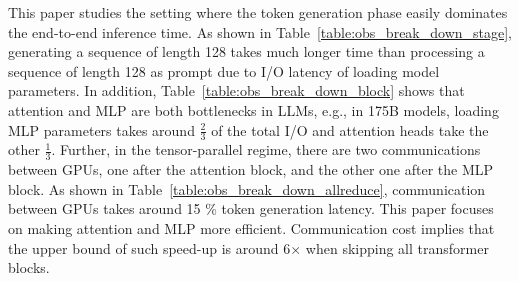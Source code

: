 This paper studies the setting where the token generation phase easily dominates the end-to-end inference time. As shown in Table~\ref{table:obs_break_down_stage}, generating a sequence of length 128 takes much longer time than processing a sequence of length 128 as prompt due to I/O latency of loading model parameters. In addition, Table~\ref{table:obs_break_down_block} shows that attention and MLP are both bottlenecks in LLMs, e.g., in 175B models, loading MLP parameters takes around $\frac{2}{3}$ of the total I/O and attention heads take the other $\frac{1}{3}$. Further, in the tensor-parallel regime, there are two communications between GPUs, one after the attention block, and the other one after the MLP block. As shown in Table~\ref{table:obs_break_down_allreduce}, communication between GPUs takes around 15 \% token generation latency. This paper focuses on making attention and MLP more efficient. Communication cost implies that the upper bound of such speed-up is around 6$\times$ when skipping all transformer blocks. 


\begin{table}[H]
\vspace{-4mm}
\scriptsize
\centering
\caption{Theoretical breakdown for prompting versus token generation (tensor model parallelism on 8 A100-80G GPUs).}
\vspace{2mm}
\vspace{-4mm}
\label{table:obs_break_down_stage}
\end{table}

